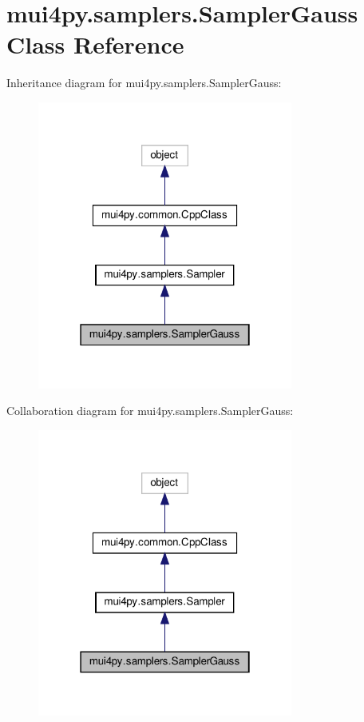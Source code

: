 \hypertarget{classmui4py_1_1samplers_1_1_sampler_gauss}{}\section{mui4py.\+samplers.\+Sampler\+Gauss Class Reference}
\label{classmui4py_1_1samplers_1_1_sampler_gauss}


Inheritance diagram for mui4py.\+samplers.\+Sampler\+Gauss\+:
\nopagebreak
\begin{figure}[H]
\begin{center}
\leavevmode
\includegraphics[width=238pt]{classmui4py_1_1samplers_1_1_sampler_gauss__inherit__graph}
\end{center}
\end{figure}


Collaboration diagram for mui4py.\+samplers.\+Sampler\+Gauss\+:
\nopagebreak
\begin{figure}[H]
\begin{center}
\leavevmode
\includegraphics[width=238pt]{classmui4py_1_1samplers_1_1_sampler_gauss__coll__graph}
\end{center}
\end{figure}
